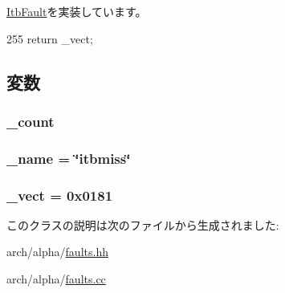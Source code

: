\hyperlink{classAlphaISA_1_1ItbFault_ae7a41506fab06a3c1e392f5286f14c66}{ItbFault}を実装しています。


\begin{DoxyCode}
255 {return _vect;}
\end{DoxyCode}


\subsection{変数}
\hypertarget{classAlphaISA_1_1ItbPageFault_a4bff925c412f331c5aaf6a39b79619ff}{
\subsubsection[{\_\-count}]{ {\bf \_\-count}}}
\label{classAlphaISA_1_1ItbPageFault_a4bff925c412f331c5aaf6a39b79619ff}
\hypertarget{classAlphaISA_1_1ItbPageFault_ac79073ffcd2c66a09bcd3bd3ad206019}{
\subsubsection[{\_\-name}]{ {\bf \_\-name} = \char`\"{}itbmiss\char`\"{}}}
\label{classAlphaISA_1_1ItbPageFault_ac79073ffcd2c66a09bcd3bd3ad206019}
\hypertarget{classAlphaISA_1_1ItbPageFault_ad9e5855b9db0b2824cf6c507be4a872e}{
\subsubsection[{\_\-vect}]{ {\bf \_\-vect} = 0x0181}}
\label{classAlphaISA_1_1ItbPageFault_ad9e5855b9db0b2824cf6c507be4a872e}


このクラスの説明は次のファイルから生成されました:\begin{DoxyCompactItemize}
\item 
arch/alpha/\hyperlink{arch_2alpha_2faults_8hh}{faults.hh}\item 
arch/alpha/\hyperlink{arch_2alpha_2faults_8cc}{faults.cc}\end{DoxyCompactItemize}
